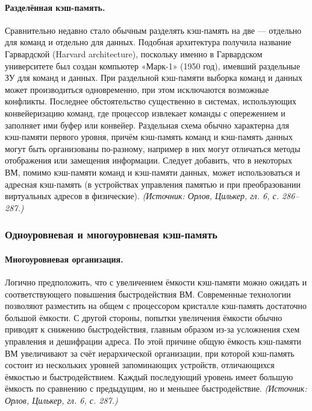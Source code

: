 \documentclass[a4paper,12pt]{article}
\begin{document}
\paragraph{Разделённая кэш-память.}
Сравнительно недавно стало обычным разделять кэш-память на две --- отдельно для команд и отдельно для данных. Подобная архитектура получила название Гарвардской (Harvard architecture), поскольку именно в Гарвардском университете был создан компьютер «Марк-1» (1950 год), имевший раздельные ЗУ для команд и данных. При раздельной кэш-памяти выборка команд и данных может производиться одновременно, при этом исключаются возможные конфликты. Последнее обстоятельство существенно в системах, использующих конвейеризацию команд, где процессор извлекает команды с опережением и заполняет ими буфер или конвейер. Раздельная схема обычно характерна для кэш-памяти первого уровня, причём кэш-память команд и кэш-память данных могут быть организованы по-разному, например в них могут отличаться методы отображения или замещения информации. Следует добавить, что в некоторых ВМ, помимо кэш-памяти команд и кэш-памяти данных, может использоваться и адресная кэш-память (в устройствах управления памятью и при преобразовании виртуальных адресов в физические).
\textit{(Источник: Орлов, Цилькер, гл. 6, с. 286--287.)}

\subsubsection{Одноуровневая и многоуровневая кэш-память}

\paragraph{Многоуровневая организация.}
Логично предположить, что с увеличением ёмкости кэш-памяти можно ожидать и соответствующего повышения быстродействия ВМ. Современные технологии позволяют разместить на общем с процессором кристалле кэш-память достаточно большой ёмкости. С другой стороны, попытки увеличения ёмкости обычно приводят к снижению быстродействия, главным образом из-за усложнения схем управления и дешифрации адреса. По этой причине общую ёмкость кэш-памяти ВМ увеличивают за счёт иерархической организации, при которой кэш-память состоит из нескольких уровней запоминающих устройств, отличающихся ёмкостью и быстродействием. Каждый последующий уровень имеет большую ёмкость по сравнению с предыдущим, но и меньшее быстродействие.
\textit{(Источник: Орлов, Цилькер, гл. 6, с. 287.)}
\end{document}
